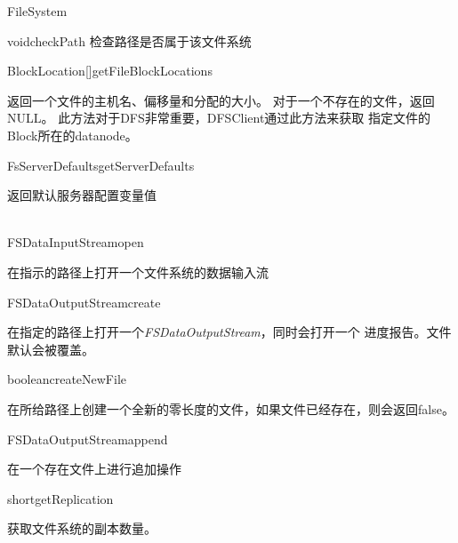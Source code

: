 \begin{XeClass}{FileSystem}
\begin{XeMethod}{\XeProtected}{void}{checkPath}
 检查路径是否属于该文件系统

    \end{XeMethod}

    \begin{XeMethod}{\XePublic}{BlockLocation[]}{getFileBlockLocations}
         
 返回一个文件的主机名、偏移量和分配的大小。
 对于一个不存在的文件，返回NULL。
 此方法对于DFS非常重要，DFSClient通过此方法来获取
 指定文件的Block所在的datanode。

    \end{XeMethod}

    \begin{XeMethod}{\XePublic}{FsServerDefaults}{getServerDefaults}
         
 返回默认服务器配置变量值

    \end{XeMethod}

    \begin{XeMethod}{\XePublic \\ \XeAbstract}{FSDataInputStream}{open}
         
 在指示的路径上打开一个文件系统的数据输入流

    \end{XeMethod}

    \begin{XeMethod}{\XePublic}{FSDataOutputStream}{create}
         
 在指定的路径上打开一个\emph{FSDataOutputStream}，同时会打开一个
 进度报告。文件默认会被覆盖。

    \end{XeMethod}

    \begin{XeMethod}{\XePublic}{boolean}{createNewFile}
         
 在所给路径上创建一个全新的零长度的文件，如果文件已经存在，则会返回false。

    \end{XeMethod}

    \begin{XeMethod}{\XePublic}{FSDataOutputStream}{append}
         
 在一个存在文件上进行追加操作

    \end{XeMethod}

    \begin{XeMethod}{\XePublic}{short}{getReplication}
         
 获取文件系统的副本数量。


\end{XeMethod}
\end{XeClass}
